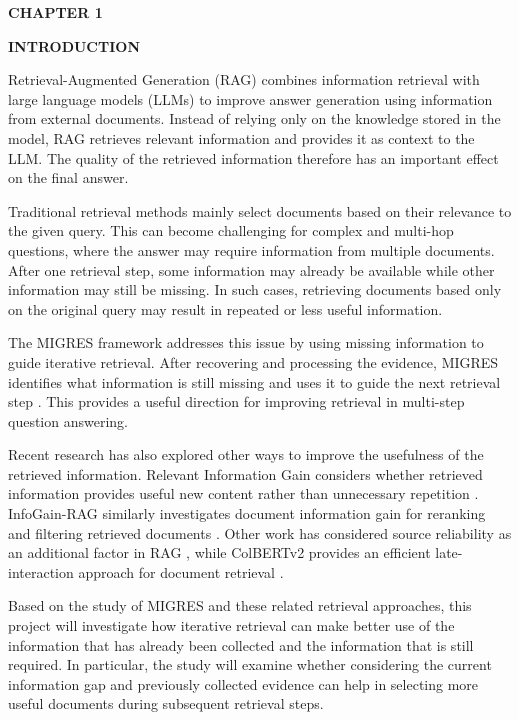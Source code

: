 \documentclass[12pt,a4paper]{report}
\newcommand{\chaptertitle}[2]{
    \begin{center}
        {\fontsize{18}{21}\selectfont\bfseries CHAPTER #1\par}
        \vspace{0.10in}
        {\fontsize{18}{21}\selectfont\bfseries #2\par}
    \end{center}
    \vspace{0.12in}
}
\begin{document}
\clearpage


\setcounter{page}{1}

\chaptertitle{1}{INTRODUCTION}

\justifying

Retrieval-Augmented Generation (RAG) combines information retrieval with large language models (LLMs) to improve answer generation using information from external documents. Instead of relying only on the knowledge stored in the model, RAG retrieves relevant information and provides it as context to the LLM. The quality of the retrieved information therefore has an important effect on the final answer.

Traditional retrieval methods mainly select documents based on their relevance to the given query. This can become challenging for complex and multi-hop questions, where the answer may require information from multiple documents. After one retrieval step, some information may already be available while other information may still be missing. In such cases, retrieving documents based only on the original query may result in repeated or less useful information.

The MIGRES framework addresses this issue by using missing information to guide iterative retrieval. After recovering and processing the evidence, MIGRES identifies what information is still missing and uses it to guide the next retrieval step \cite{wang2025migres}. This provides a useful direction for improving retrieval in multi-step question answering.

Recent research has also explored other ways to improve the usefulness of the retrieved information. Relevant Information Gain considers whether retrieved information provides useful new content rather than unnecessary repetition \cite{pickett2024better}. InfoGain-RAG similarly investigates document information gain for reranking and filtering retrieved documents \cite{wang2025infogain}. Other work has considered source reliability as an additional factor in RAG \cite{hwang2025reliability}, while ColBERTv2 provides an efficient late-interaction approach for document retrieval \cite{santhanam2022colbertv2}.

Based on the study of MIGRES and these related retrieval approaches, this project will investigate how iterative retrieval can make better use of the information that has already been collected and the information that is still required. In particular, the study will examine whether considering the current information gap and previously collected evidence can help in selecting more useful documents during subsequent retrieval steps.
\end{document}
